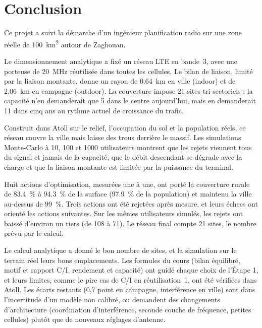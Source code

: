 \chapter{Conclusion}
\label{ch-conclusion}

Ce projet a suivi la démarche d'un ingénieur planification radio sur une zone réelle de \SI{100}{\kilo\metre\squared} autour de Zaghouan.

Le dimensionnement analytique a fixé un réseau LTE en bande~3, avec une porteuse de \SI{20}{\mega\hertz} réutilisée dans toutes les cellules. Le bilan de liaison, limité par la liaison montante, donne un rayon de \SI{0,64}{\kilo\metre} en ville (indoor) et de \SI{2,06}{\kilo\metre} en campagne (outdoor). La couverture impose 21 sites tri-sectoriels ; la capacité n'en demanderait que 5 dans le centre aujourd'hui, mais en demanderait 11 dans cinq ans au rythme actuel de croissance du trafic.

Construit dans Atoll sur le relief, l'occupation du sol et la population réels, ce réseau couvre la ville mais laisse des trous derrière le massif. Les simulations Monte-Carlo à 10, 100 et \num{1000} utilisateurs montrent que les rejets viennent tous du signal et jamais de la capacité, que le débit descendant se dégrade avec la charge et que la liaison montante est limitée par la puissance du terminal.

Huit actions d'optimisation, mesurées une à une, ont porté la couverture rurale de \SI{83,4}{\percent} à \SI{94,3}{\percent} de la surface (\SI{97,9}{\percent} de la population) et maintenu la ville au-dessus de \SI{99}{\percent}. Trois actions ont été rejetées après mesure, et leurs échecs ont orienté les actions suivantes. Sur les mêmes utilisateurs simulés, les rejets ont baissé d'environ un tiers (de 108 à 71). Le réseau final compte 21 sites, le nombre prévu par le calcul.

Le calcul analytique a donné le bon nombre de sites, et la simulation sur le terrain réel leurs bons emplacements. Les formules du cours (bilan équilibré, motif et rapport C/I, rendement et capacité) ont guidé chaque choix de l'Étape 1, et leurs limites, comme le pire cas de C/I en réutilisation~1, ont été vérifiées dans Atoll. Les écarts restants (0,7 point en campagne, interférence en ville) sont dans l'incertitude d'un modèle non calibré, ou demandent des changements d'architecture (coordination d'interférence, seconde couche de fréquence, petites cellules) plutôt que de nouveaux réglages d'antenne.
